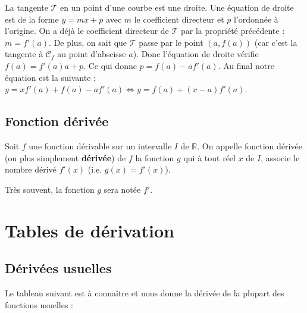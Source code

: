
	\begin{demonstration}
		La tangente $\mathcal{T}$ en un point d'une courbe est une droite. Une équation de droite est de la forme $y = mx + p$ avec $m$ le coefficient directeur et $p$ l'ordonnée à l'origine.
		\newpar
		On a déjà le coefficient directeur de $\mathcal{T}$ par la propriété précédente : $m = f'(a)$.
		\newpar
		De plus, on sait que $\mathcal{T}$ passe par le point $(a, f(a))$ (car c'est la tangente à $\mathcal{C}_f$ au point d'abscisse $a$).
		\newpar
		Donc l'équation de droite vérifie $f(a) = f'(a)a + p$. Ce qui donne $p = f(a) - af'(a)$.
		\newline
		Au final notre équation est la suivante : $y = xf'(a) + f(a) - af'(a) \iff y = f(a) + (x - a)f'(a)$.
	\end{demonstration}

	\subsection{Fonction dérivée}

	\begin{formula}[Définition]
		Soit $f$ une fonction dérivable sur un intervalle $I$ de $\mathbb{R}$.
		\newpar
		On appelle fonction dérivée (ou plus simplement \textbf{dérivée}) de $f$ la fonction $g$ qui à tout réel $x$ de $I$, associe le nombre dérivé $f'(x)$ (i.e. $g(x) = f'(x)$).
	\end{formula}

	Très souvent, la fonction $g$ sera notée $f'$.

	\section{Tables de dérivation}

	\subsection{Dérivées usuelles}

	Le tableau suivant est à connaître et nous donne la dérivée de la plupart des fonctions usuelles :

